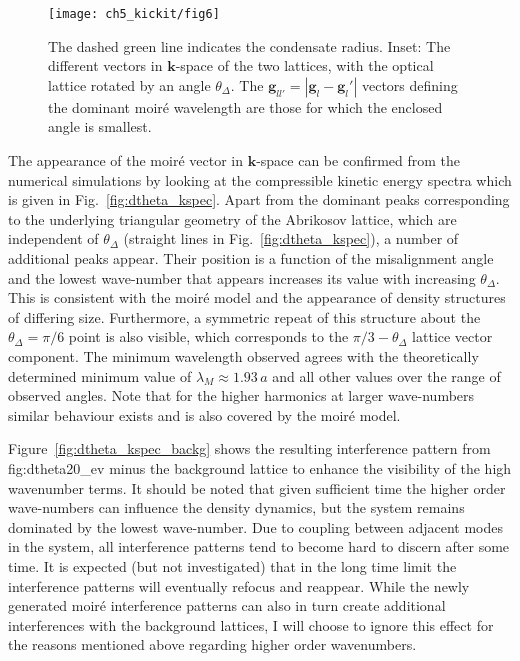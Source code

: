\begin{figure}[ht]
    \centering
	\texttt{[image: ch5\_kickit/fig6]}
	\caption[Size of the resulting moir\'e super-structures as a function of the relative angle between the vortex and optical lattice.]{The dashed green line indicates the condensate radius. Inset: The different vectors in $\mathbf{k}$-space of the two lattices, with the optical lattice rotated by an angle $\theta_\Delta$. The $\mathbf{g}_{ll'} = |\mathbf{g}_l - \mathbf{g}_l'|$ vectors defining the dominant moir\'e wavelength are those for which the enclosed angle is smallest. }
	\label{fig:moire_lambda_1}
\end{figure}

    The appearance of the moir\'e vector in $\mathbf{k}$-space can be confirmed from the numerical simulations by looking at the compressible kinetic energy spectra which is given in Fig.~\ref{fig:dtheta_kspec}. Apart from the dominant peaks corresponding to the underlying triangular geometry of the Abrikosov lattice, which are independent of $\theta_\Delta$ (straight lines in Fig.~\ref{fig:dtheta_kspec}), a number of additional peaks appear. Their position is a function of the misalignment angle and the lowest wave-number that appears increases its value with increasing $\theta_\Delta$. This is consistent with the moir\'e model and the appearance of density structures of differing size. Furthermore, a symmetric repeat of this structure about the $\theta_\Delta=\pi/6$ point is also visible, which corresponds to the $\pi/3 - \theta_\Delta$ lattice vector component. The minimum wavelength observed agrees with the theoretically determined minimum value of $\lambda_M\approx 1.93\,a$ and all other values over the range of observed angles. Note that for the higher harmonics at larger wave-numbers similar behaviour exists and is also covered by the moir\'e model.

    Figure~\ref{fig:dtheta_kspec_backg} shows the resulting interference pattern from {fig:dtheta20_ev} minus the background lattice to enhance the visibility of the high wavenumber terms. It should be noted that given sufficient time the higher order wave-numbers can influence the density dynamics, but the system remains dominated by the lowest wave-number. Due to coupling between adjacent modes in the system, all interference patterns tend to become hard to discern after some time. It is expected (but not investigated) that in the long time limit the interference patterns will eventually refocus and reappear. While the newly generated moir\'e interference patterns can also in turn create additional interferences with the background lattices, I will choose to ignore this effect for the reasons mentioned above regarding higher order wavenumbers.

